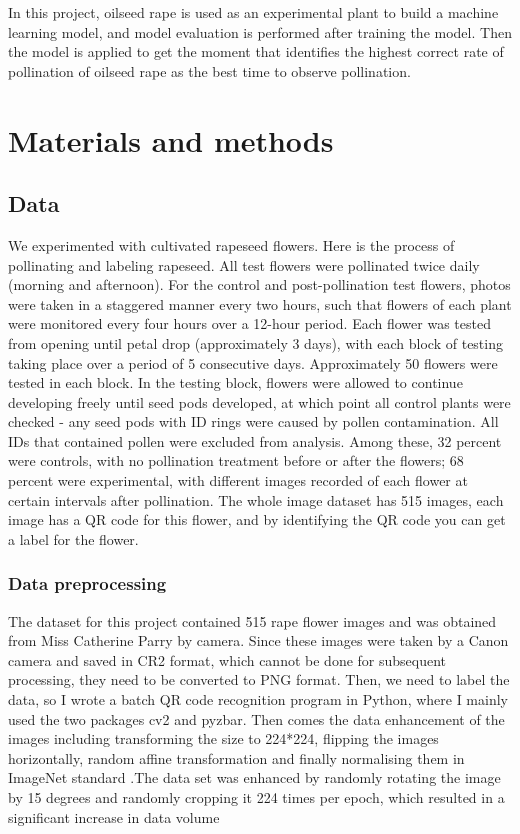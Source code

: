 \documentclass[11pt,a4paper]{article}
\begin{document}
\begin{spacing}{1.5}
In this project, oilseed rape is used as an experimental plant to build a machine learning model, and model evaluation is performed after training the model. Then the model is applied to get the moment that identifies the highest correct rate of pollination of oilseed rape as the best time to observe pollination.





\section{Materials and methods}
\subsection{Data}
We experimented with cultivated rapeseed flowers. Here is the process of pollinating and labeling rapeseed. All test flowers were pollinated twice daily (morning and afternoon). For the control and post-pollination test flowers, photos were taken in a staggered manner every two hours, such that flowers of each plant were monitored every four hours over a 12-hour period. Each flower was tested from opening until petal drop (approximately 3 days), with each block of testing taking place over a period of 5 consecutive days. Approximately 50 flowers were tested in each block. In the testing block, flowers were allowed to continue developing freely until seed pods developed, at which point all control plants were checked - any seed pods with ID rings were caused by pollen contamination. All IDs that contained pollen were excluded from analysis.
Among these, 32 percent were controls, with no pollination treatment before or after the flowers; 68 percent were experimental, with different images recorded of each flower at certain intervals after pollination. The whole image dataset has 515 images, each image has a QR code for this flower, and by identifying the QR code you can get a label for the flower.

\subsubsection{Data preprocessing}
The dataset for this project contained 515 rape flower images and was obtained from Miss Catherine Parry by camera. Since these images were taken by a Canon camera and saved in CR2 format, which cannot be done for subsequent processing, they need to be converted to PNG format.
Then, we need to label the data, so I wrote a batch QR code recognition program in Python, where I mainly used the two packages cv2 and pyzbar. Then comes the data enhancement of the images including transforming the size to 224*224, flipping the images horizontally, random affine transformation and finally normalising them in ImageNet standard \citep{krizhevsky2012imagenet}.The data set was enhanced by randomly rotating the image by 15 degrees and randomly cropping it 224 times per epoch, which resulted in a significant increase in data volume


\end{spacing}
\end{document}
